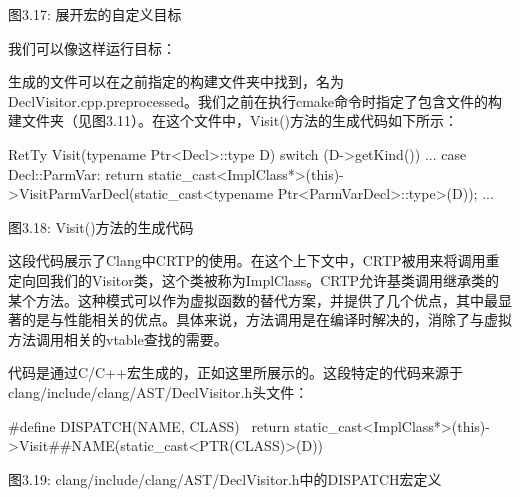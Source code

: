 
\begin{center}
图3.17: 展开宏的自定义目标
\end{center}

我们可以像这样运行目标：


生成的文件可以在之前指定的构建文件夹中找到，名为DeclVisitor.cpp.preprocessed。我们之前在执行cmake命令时指定了包含文件的构建文件夹（见图3.11）。在这个文件中，Visit()方法的生成代码如下所示：

\begin{cpp}
RetTy Visit(typename Ptr<Decl>::type D) {
  switch (D->getKind()) {
  ...
  case Decl::ParmVar: return static_cast<ImplClass*>(this)->VisitParmVarDecl(static_cast<typename Ptr<ParmVarDecl>::type>(D));
  ...
  }
}
\end{cpp}

\begin{center}
图3.18: Visit()方法的生成代码
\end{center}

这段代码展示了Clang中CRTP的使用。在这个上下文中，CRTP被用来将调用重定向回我们的Visitor类，这个类被称为ImplClass。CRTP允许基类调用继承类的某个方法。这种模式可以作为虚拟函数的替代方案，并提供了几个优点，其中最显著的是与性能相关的优点。具体来说，方法调用是在编译时解决的，消除了与虚拟方法调用相关的vtable查找的需要。

代码是通过C/C++宏生成的，正如这里所展示的。这段特定的代码来源于clang/include/clang/AST/DeclVisitor.h头文件：

\begin{cpp}
#define DISPATCH(NAME, CLASS) \
  return static_cast<ImplClass*>(this)->Visit##NAME(static_cast<PTR(CLASS)>(D))
\end{cpp}

\begin{center}
图3.19: clang/include/clang/AST/DeclVisitor.h中的DISPATCH宏定义
\end{center}

